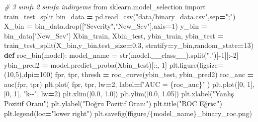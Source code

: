 \documentclass[12pt,twoside]{deuthesis}
\newenvironment{Shaded}{\begin{snugshade}}{\end{snugshade}}
\newcommand{\BuiltInTok}[1]{#1}
\newcommand{\CommentTok}[1]{\textcolor[rgb]{0.56,0.35,0.01}{\textit{#1}}}
\newcommand{\DecValTok}[1]{\textcolor[rgb]{0.00,0.00,0.81}{#1}}
\newcommand{\FloatTok}[1]{\textcolor[rgb]{0.00,0.00,0.81}{#1}}
\newcommand{\ImportTok}[1]{#1}
\newcommand{\KeywordTok}[1]{\textcolor[rgb]{0.13,0.29,0.53}{\textbf{#1}}}
\newcommand{\NormalTok}[1]{#1}
\newcommand{\OperatorTok}[1]{\textcolor[rgb]{0.81,0.36,0.00}{\textbf{#1}}}
\newcommand{\SpecialCharTok}[1]{\textcolor[rgb]{0.00,0.00,0.00}{#1}}
\newcommand{\SpecialStringTok}[1]{\textcolor[rgb]{0.31,0.60,0.02}{#1}}
\newcommand{\StringTok}[1]{\textcolor[rgb]{0.31,0.60,0.02}{#1}}
\begin{document}
\scriptsize
\begin{Shaded}
\begin{Highlighting}[]
\CommentTok{\# 3 sınıfı 2 sınıfa indirgeme}
\ImportTok{from}\NormalTok{ sklearn.model\_selection }\ImportTok{import}\NormalTok{ train\_test\_split}
\NormalTok{bin\_data }\OperatorTok{=}\NormalTok{ pd.read\_csv(}\StringTok{"data/binary\_data.csv"}\NormalTok{,sep}\OperatorTok{=}\StringTok{";"}\NormalTok{)}
\NormalTok{X\_bin }\OperatorTok{=}\NormalTok{ bin\_data.drop([}\StringTok{"Severity"}\NormalTok{,}\StringTok{"New\_Sev"}\NormalTok{],axis}\OperatorTok{=}\DecValTok{1}\NormalTok{)}
\NormalTok{y\_bin }\OperatorTok{=}\NormalTok{ bin\_data[}\StringTok{"New\_Sev"}\NormalTok{]}
\NormalTok{Xbin\_train, Xbin\_test, ybin\_train, ybin\_test }\OperatorTok{=}\NormalTok{ train\_test\_split(X\_bin,y\_bin,test\_size}\OperatorTok{=}\FloatTok{0.3}\NormalTok{,}
\NormalTok{                                                                stratify}\OperatorTok{=}\NormalTok{y\_bin,random\_state}\OperatorTok{=}\DecValTok{13}\NormalTok{)}
\KeywordTok{def}\NormalTok{ roc\_bin(model):}
\NormalTok{    model\_name }\OperatorTok{=} \BuiltInTok{str}\NormalTok{(model.\_\_class\_\_).split(}\StringTok{"."}\NormalTok{)[}\OperatorTok{{-}}\DecValTok{1}\NormalTok{][:}\OperatorTok{{-}}\DecValTok{2}\NormalTok{]}
\NormalTok{    ybin\_pred2 }\OperatorTok{=}\NormalTok{ model.predict\_proba(Xbin\_test)[::, }\DecValTok{1}\NormalTok{]}
\NormalTok{    plt.figure(figsize}\OperatorTok{=}\NormalTok{(}\DecValTok{10}\NormalTok{,}\DecValTok{5}\NormalTok{),dpi}\OperatorTok{=}\DecValTok{100}\NormalTok{)}
\NormalTok{    fpr, tpr, thresh }\OperatorTok{=}\NormalTok{ roc\_curve(ybin\_test, ybin\_pred2)}
\NormalTok{    roc\_auc }\OperatorTok{=}\NormalTok{ auc(fpr, tpr)}
\NormalTok{    plt.plot(}
\NormalTok{        fpr,}
\NormalTok{        tpr,}
\NormalTok{        lw}\OperatorTok{=}\DecValTok{2}\NormalTok{,}
\NormalTok{        label}\OperatorTok{=}\SpecialStringTok{f"AUC = }\SpecialCharTok{\{}\NormalTok{roc\_auc}\SpecialCharTok{\}}\SpecialStringTok{"}
\NormalTok{        )}
\NormalTok{    plt.plot([}\DecValTok{0}\NormalTok{, }\DecValTok{1}\NormalTok{], [}\DecValTok{0}\NormalTok{, }\DecValTok{1}\NormalTok{], }\StringTok{"k{-}{-}"}\NormalTok{, lw}\OperatorTok{=}\DecValTok{2}\NormalTok{)}
\NormalTok{    plt.xlim([}\FloatTok{0.0}\NormalTok{, }\FloatTok{1.0}\NormalTok{])}
\NormalTok{    plt.ylim([}\FloatTok{0.0}\NormalTok{, }\FloatTok{1.05}\NormalTok{])}
\NormalTok{    plt.xlabel(}\StringTok{"Yanlış Pozitif Oranı"}\NormalTok{)}
\NormalTok{    plt.ylabel(}\StringTok{"Doğru Pozitif Oranı"}\NormalTok{)}
\NormalTok{    plt.title(}\StringTok{"ROC Eğrisi"}\NormalTok{)}
\NormalTok{    plt.legend(loc}\OperatorTok{=}\StringTok{"lower right"}\NormalTok{)}
\NormalTok{    plt.savefig(}\SpecialStringTok{f\textquotesingle{}figure/}\SpecialCharTok{\{}\NormalTok{model\_name}\SpecialCharTok{\}}\SpecialStringTok{\_binary\_roc.png\textquotesingle{}}\NormalTok{)}
\end{Highlighting}
\end{Shaded}
\normalsize
\end{document}
